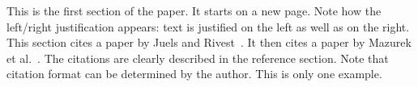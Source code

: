 This is the first section of the paper. It starts on a new page. Note how the left/right justification appears: text is justified on the left as well as on the right.  This section cites a paper by Juels and Rivest~\cite{Juels:2013:HMP:2508859.2516671}. It then cites a paper by Mazurek et al.~\cite{Mazurek:2013:MPG:2508859.2516726}. The citations are clearly described in the reference section. Note that citation format can be determined by the author. This is only one example.


